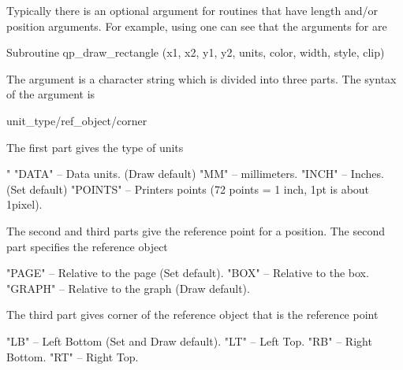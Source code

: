 Typically there is an optional  argument for \quickplot routines that
have length and/or position arguments. For example, using  one can
see that the arguments for  are
\begin{example}
  Subroutine qp_draw_rectangle (x1, x2, y1, y2, units, color, width, style, clip)
\end{example}
The  argument is a character string which is divided into three
parts. The syntax of the  argument is
\begin{example}
  unit_type/ref_object/corner
\end{example}
The first part  gives the type of units
\begin{example}
  "%
  "DATA"    -- Data units. (Draw default)
  "MM"      -- millimeters.
  "INCH"    -- Inches. (Set default)
  "POINTS"  -- Printers points (72 points = 1 inch, 1pt is about 1pixel).
\end{example}
The second and third parts give the reference point for a position.
The second part specifies the reference object
\begin{example}
    "PAGE"  -- Relative to the page (Set default).
    "BOX"   -- Relative to the box.
    "GRAPH" -- Relative to the graph (Draw default).
\end{example}
The third part gives corner of the reference object that is the reference point
\begin{example}
    "LB"    -- Left Bottom (Set and Draw default).
    "LT"    -- Left Top.
    "RB"    -- Right Bottom.
    "RT"    -- Right Top.
\end{example}

